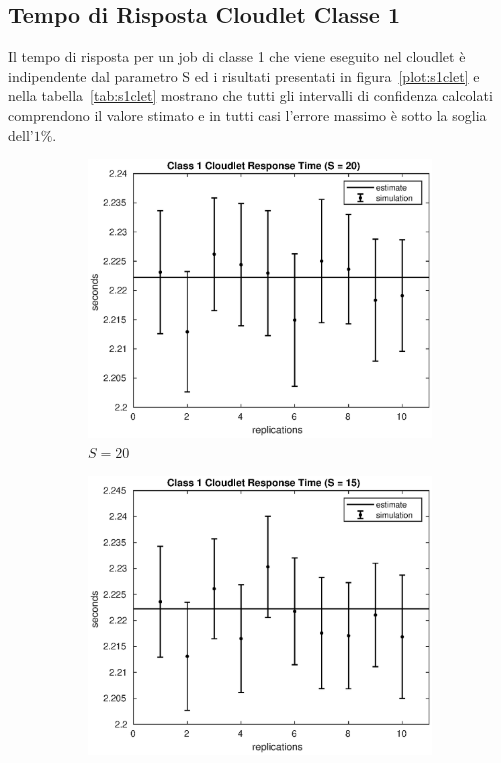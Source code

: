 \subsection{Tempo di Risposta Cloudlet Classe 1}
Il tempo di risposta per un job di classe 1 che viene eseguito nel cloudlet è
indipendente dal parametro S ed i risultati presentati in
figura~\ref{plot:s1clet} e nella tabella~\ref{tab:s1clet} mostrano che tutti gli
intervalli di confidenza calcolati comprendono il valore stimato e in tutti casi
l'errore massimo è sotto la soglia dell'$1\%$.
\begin{figure}[!h]
\centering
%
\begin{subfigure}[t]{0.49\textwidth}
\includegraphics[width=\textwidth]{figures/simul/20_500K_s1clet}
\caption{$S = 20$}
\label{20_s1clet}
\end{subfigure}
%
\begin{subfigure}[t]{0.49\textwidth}
\includegraphics[width=\textwidth]{figures/simul/15_500K_s1clet}

\end{subfigure}
\end{figure}
